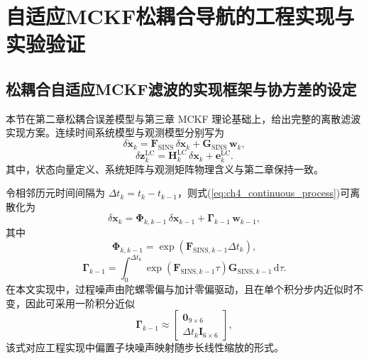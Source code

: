 \chapter{自适应MCKF松耦合导航的工程实现与实验验证}
\section{松耦合自适应MCKF滤波的实现框架与协方差的设定}
本节在第二章松耦合误差模型与第三章 MCKF 理论基础上，给出完整的离散滤波实现方案\cite{izanloo2016kalman}。连续时间系统模型与观测模型分别写为
\begin{equation}
	\delta \dot{\bm{x}}_k = \bm{F}_{\text{SINS}}\,\delta\bm{x}_k + \bm{G}_{\text{SINS}}\,\bm{w}_k,
	\label{eq:ch4_continuous_process}
\end{equation}
\begin{equation}
	\delta\bm{z}^{\text{LC}}_k = \bm{H}^{\text{LC}}_k\,\delta\bm{x}_k + \bm{e}^{\text{LC}}_k.
	\label{eq:ch4_continuous_measure}
\end{equation}
其中，状态向量定义、系统矩阵与观测矩阵物理含义与第二章保持一致。

令相邻历元时间间隔为 $\Delta t_k=t_k-t_{k-1}$，则式(\ref{eq:ch4_continuous_process})可离散化为
\begin{equation}
	\delta\bm{x}_{k} = \bm{\Phi}_{k,k-1}\,\delta\bm{x}_{k-1} + \bm{\Gamma}_{k-1}\,\bm{w}_{k-1},
	\label{eq:ch4_discrete_process}
\end{equation}
其中
\begin{equation}
	\bm{\Phi}_{k,k-1}=\exp\!\left(\bm{F}_{\text{SINS},k-1}\Delta t_k\right),
\end{equation}
\begin{equation}
	\bm{\Gamma}_{k-1}=\int_0^{\Delta t_k}\exp\!\left(\bm{F}_{\text{SINS},k-1}\tau\right)\bm{G}_{\text{SINS},k-1}\,\mathrm{d}\tau.
	\label{eq:ch4_gamma_integral}
\end{equation}
在本文实现中，过程噪声由陀螺零偏与加计零偏驱动，且在单个积分步内近似时不变，因此可采用一阶积分近似
\begin{equation}
	\bm{\Gamma}_{k-1}\approx
	\begin{bmatrix}
		\bm{0}_{9\times6}\\
		\Delta t_k\bm{I}_{6\times6}
	\end{bmatrix},
	\label{eq:ch4_gamma_approx}
\end{equation}
该式对应工程实现中偏置子块噪声映射随步长线性缩放的形式。

